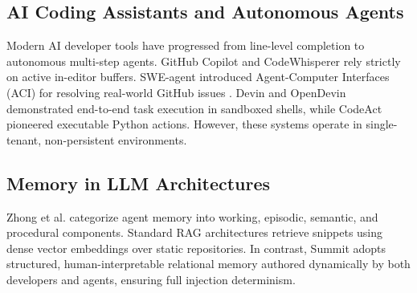\documentclass[conference]{IEEEtran}
\begin{document}
\subsection{AI Coding Assistants and Autonomous Agents}
Modern AI developer tools have progressed from line-level completion to autonomous multi-step agents. GitHub Copilot \cite{copilot} and CodeWhisperer \cite{codewhisperer} rely strictly on active in-editor buffers. SWE-agent \cite{yang2024sweagent} introduced Agent-Computer Interfaces (ACI) for resolving real-world GitHub issues \cite{jimenez2024swebench}. Devin \cite{devin2024} and OpenDevin \cite{wang2024opendevin} demonstrated end-to-end task execution in sandboxed shells, while CodeAct \cite{wang2024codeact} pioneered executable Python actions. However, these systems operate in single-tenant, non-persistent environments.

\subsection{Memory in LLM Architectures}
Zhong et al. \cite{zhang2024memorysurvey} categorize agent memory into working, episodic, semantic, and procedural components. Standard RAG architectures \cite{lewis2020rag, shrivastava2023rlcg, zhang2023repocoder} retrieve snippets using dense vector embeddings over static repositories. In contrast, Summit adopts structured, human-interpretable relational memory authored dynamically by both developers and agents, ensuring full injection determinism.
\end{document}
